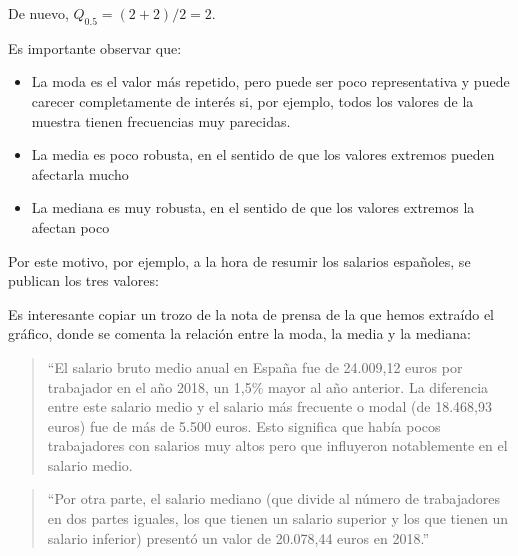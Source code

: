 \documentclass[
  spanish,
  letterpaper,
  DIV=11,
  numbers=noendperiod]{scrreprt}
\begin{document}
De nuevo, \(Q_{0.5}=(2+2)/2=2\).

\begin{tcolorbox}[enhanced jigsaw, arc=.35mm, bottomrule=.15mm, bottomtitle=1mm, breakable, colback=white, colbacktitle=quarto-callout-note-color!10!white, colframe=quarto-callout-note-color-frame, coltitle=black, left=2mm, leftrule=.75mm, opacityback=0, opacitybacktitle=0.6, rightrule=.15mm, title=\textcolor{quarto-callout-note-color}{\faInfo}\hspace{0.5em}{Nota}, titlerule=0mm, toprule=.15mm, toptitle=1mm]

Es importante observar que:

\begin{itemize}
\item
  La moda es el valor más repetido, pero puede ser poco representativa y
  puede carecer completamente de interés si, por ejemplo, todos los
  valores de la muestra tienen frecuencias muy parecidas.
\item
  La media es poco robusta, en el sentido de que los valores extremos
  pueden afectarla mucho
\item
  La mediana es muy robusta, en el sentido de que los valores extremos
  la afectan poco
\end{itemize}

\end{tcolorbox}

Por este motivo, por ejemplo, a la hora de resumir los salarios
españoles, se publican los tres valores:

Es interesante copiar un trozo de la nota de prensa de la que hemos
extraído el gráfico, donde se comenta la relación entre la moda, la
media y la mediana:

\begin{quote}
``El salario bruto medio anual en España fue de 24.009,12 euros por
trabajador en el año 2018, un 1,5\% mayor al año anterior. La diferencia
entre este salario medio y el salario más frecuente o modal (de
18.468,93 euros) fue de más de 5.500 euros. Esto significa que había
pocos trabajadores con salarios muy altos pero que influyeron
notablemente en el salario medio.
\end{quote}

\begin{quote}
``Por otra parte, el salario mediano (que divide al número de
trabajadores en dos partes iguales, los que tienen un salario superior y
los que tienen un salario inferior) presentó un valor de 20.078,44 euros
en 2018.''
\end{quote}
\end{document}
